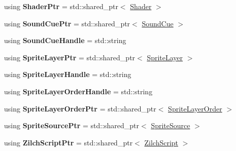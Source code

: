 \begin{DoxyCompactItemize}
\item 
\hypertarget{namespaceDCEngine_a1958fe3673e5aa7449d8374138efc90a}{using {\bfseries Shader\-Ptr} = std\-::shared\-\_\-ptr$<$ \hyperlink{classDCEngine_1_1Shader}{Shader} $>$}\label{namespaceDCEngine_a1958fe3673e5aa7449d8374138efc90a}

\item 
\hypertarget{namespaceDCEngine_a23fd37dddf160553f9a0d4bf83cddd9e}{using {\bfseries Sound\-Cue\-Ptr} = std\-::shared\-\_\-ptr$<$ \hyperlink{classDCEngine_1_1SoundCue}{Sound\-Cue} $>$}\label{namespaceDCEngine_a23fd37dddf160553f9a0d4bf83cddd9e}

\item 
\hypertarget{namespaceDCEngine_a49196c2f5a09b4cf6013e52006c175dc}{using {\bfseries Sound\-Cue\-Handle} = std\-::string}\label{namespaceDCEngine_a49196c2f5a09b4cf6013e52006c175dc}

\item 
\hypertarget{namespaceDCEngine_a58479aef997cfa44cac6e4b4dd28ad5d}{using {\bfseries Sprite\-Layer\-Ptr} = std\-::shared\-\_\-ptr$<$ \hyperlink{classDCEngine_1_1SpriteLayer}{Sprite\-Layer} $>$}\label{namespaceDCEngine_a58479aef997cfa44cac6e4b4dd28ad5d}

\item 
\hypertarget{namespaceDCEngine_a5e33d726ac91c2981ed8498c489d8f92}{using {\bfseries Sprite\-Layer\-Handle} = std\-::string}\label{namespaceDCEngine_a5e33d726ac91c2981ed8498c489d8f92}

\item 
\hypertarget{namespaceDCEngine_a5fca000f6a185eef07e3a5eb98fa33fd}{using {\bfseries Sprite\-Layer\-Order\-Handle} = std\-::string}\label{namespaceDCEngine_a5fca000f6a185eef07e3a5eb98fa33fd}

\item 
\hypertarget{namespaceDCEngine_a232b27e36bc26d90f63dbab1b30db55f}{using {\bfseries Sprite\-Layer\-Order\-Ptr} = std\-::shared\-\_\-ptr$<$ \hyperlink{classDCEngine_1_1SpriteLayerOrder}{Sprite\-Layer\-Order} $>$}\label{namespaceDCEngine_a232b27e36bc26d90f63dbab1b30db55f}

\item 
\hypertarget{namespaceDCEngine_a557e7662165a9e23d463e3933f610bca}{using {\bfseries Sprite\-Source\-Ptr} = std\-::shared\-\_\-ptr$<$ \hyperlink{classDCEngine_1_1SpriteSource}{Sprite\-Source} $>$}\label{namespaceDCEngine_a557e7662165a9e23d463e3933f610bca}

\item 
\hypertarget{namespaceDCEngine_a6b79e53733bdb4f0e3b630b16f4a3266}{using {\bfseries Zilch\-Script\-Ptr} = std\-::shared\-\_\-ptr$<$ \hyperlink{classDCEngine_1_1ZilchScript}{Zilch\-Script} $>$}\label{namespaceDCEngine_a6b79e53733bdb4f0e3b630b16f4a3266}


\end{DoxyCompactItemize}
